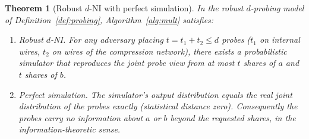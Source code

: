 \documentclass[lettersize,journal]{IEEEtran}
\newtheorem{theorem}{Theorem}
\begin{document}
\begin{theorem}[Robust $d$-NI with perfect simulation]
\label{thm:main}
In the robust $d$-probing model of Definition~\ref{def:probing},
Algorithm~\ref{alg:mult} satisfies:
\begin{enumerate}
\item[(i)] \emph{Robust $d$-NI.} For any adversary placing $t=t_1+t_2\le d$
probes ($t_1$ on internal wires, $t_2$ on wires of the compression network),
there exists a probabilistic simulator that reproduces the joint probe view
from at most $t$ shares of $a$ and $t$ shares of $b$.
\item[(ii)] \emph{Perfect simulation.} The simulator's output distribution
equals the real joint distribution of the probes exactly (statistical
distance zero). Consequently the probes carry no information about $a$ or
$b$ beyond the requested shares, in the information-theoretic sense.
\end{enumerate}
\end{theorem}
\end{document}

